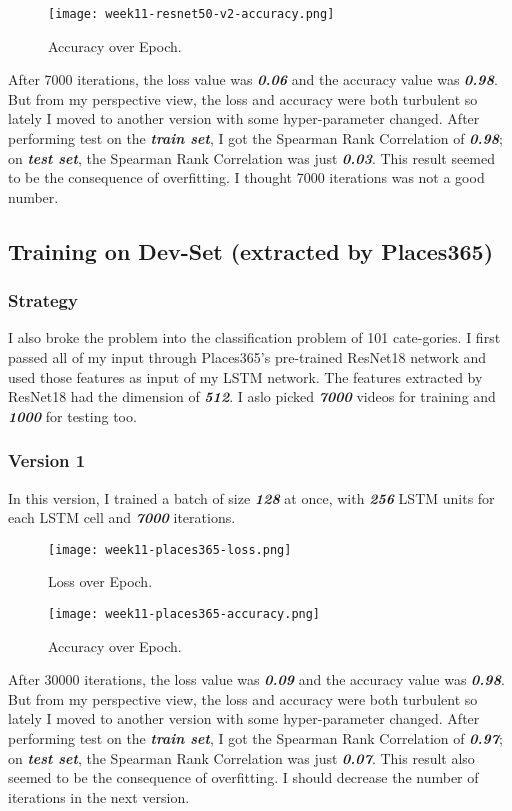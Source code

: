 \begin{figure}[!ht]
\centering
\texttt{[image: week11-resnet50-v2-accuracy.png]}
\caption{Accuracy over Epoch.}
\end{figure}

After 7000 iterations, the loss value was \textbf{\emph{0.06}} and the accuracy value was \textbf{\emph{0.98}}. But from my perspective view, the loss and accuracy were both turbulent so lately I moved to another version with some hyper-parameter changed. After performing test on the \textbf{\emph{train set}}, I got the Spearman Rank Correlation of \textbf{\emph{0.98}}; on \textbf{\emph{test set}}, the Spearman Rank Correlation was just \textbf{\emph{0.03}}. This result seemed to be the consequence of overfitting. I thought 7000 iterations was not a good number.

\subsection{Training on Dev-Set (extracted by Places365)}
\subsubsection{Strategy}
I also broke the problem into the classification problem of 101 cate-gories. I first passed all of my input through Places365's pre-trained ResNet18 network and used those features as input of my LSTM network. The features extracted by ResNet18 had the dimension of \textbf{\emph{512}}. I aslo picked \textbf{\emph{7000}} videos for training and \textbf{\emph{1000}} for testing too.

\subsubsection{Version 1}
In this version, I trained a batch of size \textbf{\emph{128}} at once, with \textbf{\emph{256}} LSTM units for each LSTM cell and \textbf{\emph{7000}} iterations.

\begin{figure}[!ht]
\centering
\texttt{[image: week11-places365-loss.png]}
\caption{Loss over Epoch.}
\end{figure}

\begin{figure}[!ht]
\centering
\texttt{[image: week11-places365-accuracy.png]}
\caption{Accuracy over Epoch.}
\end{figure}

After 30000 iterations, the loss value was \textbf{\emph{0.09}} and the accuracy value was \textbf{\emph{0.98}}. But from my perspective view, the loss and accuracy were both turbulent so lately I moved to another version with some hyper-parameter changed. After performing test on the \textbf{\emph{train set}}, I got the Spearman Rank Correlation of \textbf{\emph{0.97}}; on \textbf{\emph{test set}}, the Spearman Rank Correlation was just \textbf{\emph{0.07}}. This result also seemed to be the consequence of overfitting. I should decrease the number of iterations in the next version.
